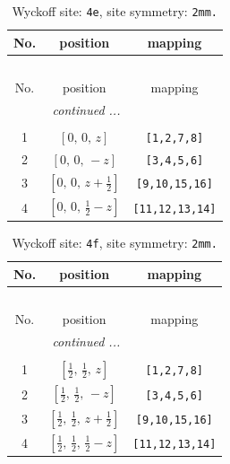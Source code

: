 \documentclass[fleqn,8pt]{jsarticle}
\begin{document}
\begin{longtable}{ccc}
\caption{Wyckoff site: {\tt 4e}, site symmetry: {\tt 2mm.}}
 \\
 \hline \hline
No. & position & mapping \\ \hline \endfirsthead

\multicolumn{2}{l}{\tablename\ \thetable{}} \\
 \hline \hline
No. & position & mapping \\ \hline \endhead

 \hline \hline
\multicolumn{2}{r}{\footnotesize\it continued ...} \\ \endfoot

 \hline \hline
\multicolumn{2}{r}{} \\ \endlastfoot

1 & $\left[ 0,\, 0,\, z \right]$ & {\tt [1,2,7,8]} \\ \hline
2 & $\left[ 0,\, 0,\, - z \right]$ & {\tt [3,4,5,6]} \\ \hline
3 & $\left[ 0,\, 0,\, z + \frac{1}{2} \right]$ & {\tt [9,10,15,16]} \\ \hline
4 & $\left[ 0,\, 0,\, \frac{1}{2} - z \right]$ & {\tt [11,12,13,14]} \\
\end{longtable}
\renewcommand{\arraystretch}{1.2}
\begin{longtable}{ccc}
\caption{Wyckoff site: {\tt 4f}, site symmetry: {\tt 2mm.}}
 \\
 \hline \hline
No. & position & mapping \\ \hline \endfirsthead

\multicolumn{2}{l}{\tablename\ \thetable{}} \\
 \hline \hline
No. & position & mapping \\ \hline \endhead

 \hline \hline
\multicolumn{2}{r}{\footnotesize\it continued ...} \\ \endfoot

 \hline \hline
\multicolumn{2}{r}{} \\ \endlastfoot

1 & $\left[ \frac{1}{2},\, \frac{1}{2},\, z \right]$ & {\tt [1,2,7,8]} \\ \hline
2 & $\left[ \frac{1}{2},\, \frac{1}{2},\, - z \right]$ & {\tt [3,4,5,6]} \\ \hline
3 & $\left[ \frac{1}{2},\, \frac{1}{2},\, z + \frac{1}{2} \right]$ & {\tt [9,10,15,16]} \\ \hline
4 & $\left[ \frac{1}{2},\, \frac{1}{2},\, \frac{1}{2} - z \right]$ & {\tt [11,12,13,14]} \\
\end{longtable}
\end{document}
